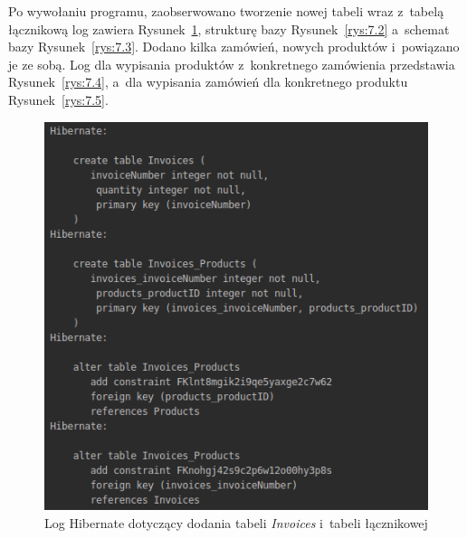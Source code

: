 \documentclass[12pt, a4paper]{mwart}
\begin{document}
Po wywołaniu programu, zaobserwowano tworzenie nowej tabeli wraz z~tabelą łącznikową \ppauza log zawiera Rysunek~\ref{rys:7.1}, strukturę bazy Rysunek~\ref{rys:7.2} a~schemat bazy Rysunek~\ref{rys:7.3}. Dodano kilka zamówień, nowych produktów i~powiązano je ze sobą. Log dla wypisania produktów z~konkretnego zamówienia przedstawia Rysunek~\ref{rys:7.4}, a~dla wypisania zamówień dla konkretnego produktu Rysunek~\ref{rys:7.5}.

\begin{figure}[ht]
  \centering
  \includegraphics[scale=0.60]{VII/7-1.png}
  \caption{Log Hibernate dotyczący dodania tabeli \textit{Invoices} i~tabeli łącznikowej}
  \label{rys:7.1}
\end{figure}
\end{document}
